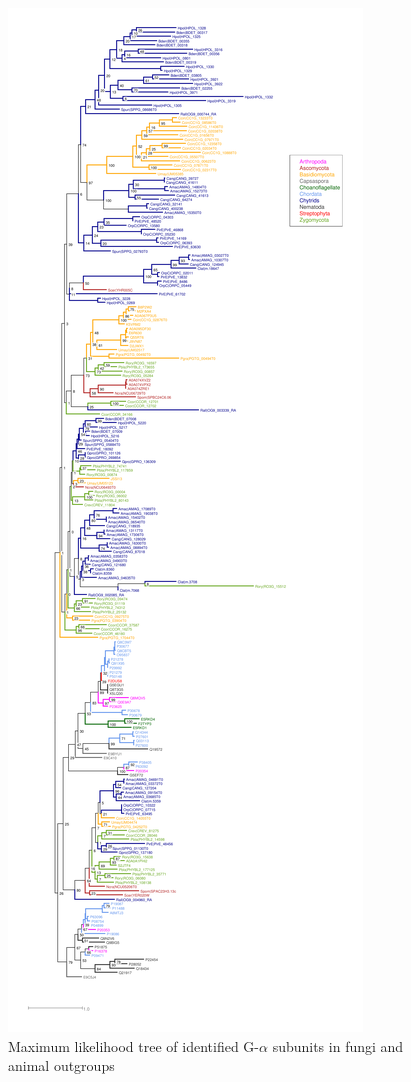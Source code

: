 \begin{figure}[hb]
  \centering
  \includegraphics{./Chapter_RhodAux/img/Galpha_tree.png}
  \caption[G$\alpha$ tree]{Maximum likelihood tree of identified G-$\alpha$ subunits in fungi and animal outgroups}
  \label{fig:ChRhodA_GbetaTree}
\end{figure}

